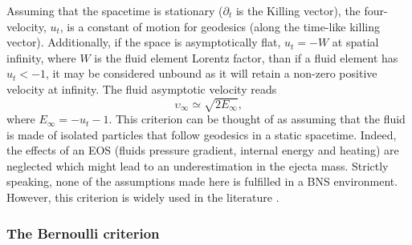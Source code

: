 Assuming that the spacetime is stationary ($\partial_t$ is the Killing vector), %
the four-velocity, $u_t$, is a constant of motion for geodesics 
(along the time-like killing vector). 
%
Additionally, if the space is asymptotically flat, $u_t = -W$ at spatial infinity, 
where $W$ is the fluid element Lorentz factor, 
than if a fluid element has $u_t < -1$, it may be considered unbound 
as it will retain a non-zero positive velocity at infinity. 
%
The fluid asymptotic velocity reads 
\begin{equation}
\upsilon_{\infty} \simeq \sqrt{2E_{\infty}}, %
\end{equation}
%
where $E_{\infty} = -u_t - 1$.
%
This criterion can be thought of as assuming that the fluid 
is made of isolated particles that follow geodesics in
a static spacetime. Indeed, the effects of an \ac{EOS} 
(fluids pressure gradient, internal energy and heating) %
are neglected which might lead to an 
underestimation in the ejecta mass. 
%
%
Strictly speaking, none of the assumptions made here is 
fulfilled in a \ac{BNS} \pmerg{} environment. However, this criterion 
is widely used in the literature 
\citep[\eg][]{Radice:2018pdn,Vincent:2019kor}.



\subsubsection{The Bernoulli criterion}

